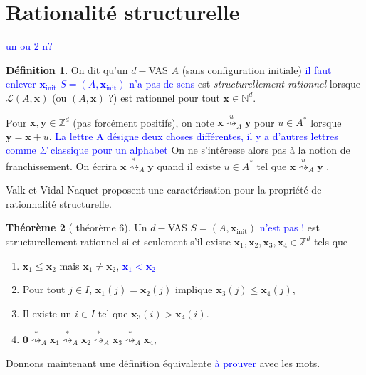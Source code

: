 \documentclass[a4paper,final]{article}
\theoremstyle{definition}
\newtheorem{Theorem}{Théorème}
\newtheorem{Definition}[Theorem]{Définition}
\let\leq\leqslant
\newcommand{\alain}[1]{\textcolor{blue}{#1}}
\newcommand{\N}{\ensuremath{\mathbb{N}}}
\newcommand{\Z}{\ensuremath{\mathbb{Z}}}
\newcommand{\lang}{\ensuremath{\mathcal{L}}}
\newcommand{\transZ}[2]{\ensuremath{\stackrel{#1}{\rightsquigarrow}_{#2}}}
\newcommand{\vect}[1]{\ensuremath{\mathbf{#1}}}
\newcommand{\xinit}{\ensuremath{\vect{x}_\text{init}}}
\newcommand{\valeur}[1]{\ensuremath{\overline{#1}}}
\begin{document}

\section{Rationalité structurelle}\alain{un ou 2 n?}

\begin{Definition}
On dit qu'un $d-$VAS $A$ (sans configuration initiale)  \alain{il faut enlever $\xinit$ $S=(A,\xinit)$ n'a pas de sens} est \emph{structurellement rationnel} lorsque   $\lang(A,\vect{x})$ (ou $(A,\vect{x})$ ?) est rationnel pour  tout  $\vect{x}\in\N^d$.
\end{Definition}

Pour $\vect{x},\vect{y}\in\Z^d$ (pas forcément positifs), on note $\vect{x} \transZ{u}{A} \vect{y}$ pour $u\in A^*$ lorsque $\vect{y} = \vect{x} + \valeur{u}$.
\alain{La lettre A désigne deux choses différentes, il y a d'autres lettres comme $\Sigma$ classique pour un alphabet}
On ne s'intéresse alors pas à la notion de franchissement.
On écrira $\vect{x} \transZ{*}{A} \vect{y}$ quand il existe $u\in A^*$ tel que $\vect{x} \transZ{u}{A} \vect{y}$ .

Valk et Vidal-Naquet proposent une caractérisation pour la propriété de rationnalité structurelle.

\begin{Theorem}[\cite{vavi81} théorème 6]
Un $d-$VAS $S=(A,\xinit)$ \alain{n'est pas !} est structurellement rationnel si et seulement s'il existe $\vect{x}_1, \vect{x}_2, \vect{x}_3, \vect{x}_4 \in \Z^d$ tels que 
\begin{enumerate}
    \item $\vect{x}_1 \leq \vect{x}_2$ mais $\vect{x}_1 \neq \vect{x}_2$, 
		\alain{$\vect{x}_1 < \vect{x}_2$}
    \item Pour tout $j \in I$, $\vect{x}_1(j) = \vect{x}_2(j)$ implique $\vect{x}_3(j) \leq \vect{x}_4(j)$,
    \item Il existe un $i\in I$ tel que $\vect{x}_3(i) > \vect{x}_4(i)$.
    
    \item $\vect{0} \transZ{*}{A} \vect{x}_1 \transZ{*}{A} \vect{x}_2 \transZ{*}{A} \vect{x}_3 \transZ{*}{A} \vect{x}_4$,
\end{enumerate}
\end{Theorem}

Donnons maintenant une définition équivalente \alain{à prouver} avec les mots.
\end{document}
